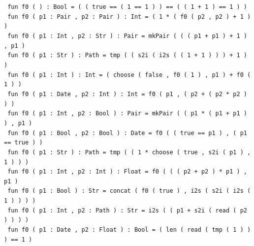 \documentclass[sigplan,nonacm]{acmart}\settopmatter{printfolios=false,printccs=false,printacmref=false}
\begin{document}
\begin{tiny}
  \texttt{ fun f0 ( ) : Bool = ( ( true == ( 1 == 1 ) ) == ( ( 1 + 1 ) == 1 ) )}\\
  \texttt{ fun f0 ( p1 : Pair , p2 : Pair ) : Int = ( 1 * ( f0 ( p2 , p2 ) + 1 ) )}\\
  \texttt{ fun f0 ( p1 : Int , p2 : Str ) : Pair = mkPair ( ( ( p1 + p1 ) + 1 ) , p1 )}\\
  \texttt{ fun f0 ( p1 : Str ) : Path = tmp ( ( s2i ( i2s ( ( 1 + 1 ) ) ) + 1 ) )}\\
  \texttt{ fun f0 ( p1 : Int ) : Int = ( choose ( false , f0 ( 1 ) , p1 ) + f0 ( 1 ) )}\\
  \texttt{ fun f0 ( p1 : Date , p2 : Int ) : Int = f0 ( p1 , ( p2 + ( p2 * p2 ) ) )}\\
  \texttt{ fun f0 ( p1 : Int , p2 : Bool ) : Pair = mkPair ( ( p1 * ( p1 + p1 ) ) , p1 )}\\
  \texttt{ fun f0 ( p1 : Bool , p2 : Bool ) : Date = f0 ( ( true == p1 ) , ( p1 == true ) )}\\
  \texttt{ fun f0 ( p1 : Str ) : Path = tmp ( ( 1 * choose ( true , s2i ( p1 ) , 1 ) ) )}\\
  \texttt{ fun f0 ( p1 : Int , p2 : Int ) : Float = f0 ( ( ( p2 + p2 ) * p1 ) , p1 )}\\
  \texttt{ fun f0 ( p1 : Bool ) : Str = concat ( f0 ( true ) , i2s ( s2i ( i2s ( 1 ) ) ) )}\\
  \texttt{ fun f0 ( p1 : Int , p2 : Path ) : Str = i2s ( ( p1 + s2i ( read ( p2 ) ) ) )}\\
  \texttt{ fun f0 ( p1 : Date , p2 : Float ) : Bool = ( len ( read ( tmp ( 1 ) ) ) == 1 )}
\end{tiny}
  \clearpage
\end{document}
